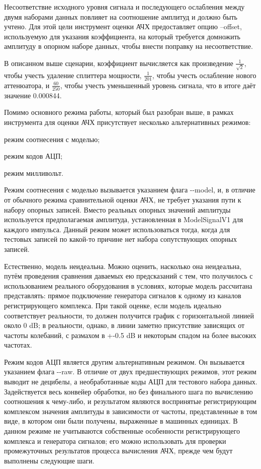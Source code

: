 \documentclass{report}
\begin{document}
Несоответствие исходного уровня сигнала и последующего ослабления между двумя наборами данных повлияет на соотношение амплитуд и должно быть учтено. Для этой цели инструмент оценки АЧХ предоставляет опцию --offset, используемую для указания коэффициента, на который требуется домножить амплитуду в опорном наборе данных, чтобы внести поправку на несоответствие.

В описанном выше сценарии, коэффициент вычисляется как произведение $\frac{1}{\sqrt{2}}$, чтобы учесть удаление сплиттера мощности, $\frac{1}{201}$, чтобы учесть ослабление нового аттенюатора, и $\frac{60}{250}$, чтобы учесть уменьшенный уровень сигнала, что в итоге даёт значение 0.000844.

Помимо основного режима работы, который был разобран выше, в рамках инструмента для оценки АЧХ присутствует несколько альтернативных режимов:

\begin{enummarker}
    \item режим соотнесения с моделью;
    \item режим кодов АЦП;
    \item режим милливольт.
\end{enummarker}

Режим соотнесения с моделью вызывается указанием флага -{}-model, и, в отличие от обычного режима сравнительной оценки АЧХ, не требует указания пути к набору опорных записей. Вместо реальных опорных значений амплитуды используется предполагаемая амплитуда, установленная в ModelSignalV1 для каждого импульса. Данный режим может использоваться тогда, когда для тестовых записей по какой-то причине нет набора сопутствующих опорных записей.

Естественно, модель неидеальна. Можно оценить, насколько она неидеальна, путём проведения сравнения даваемых ею предсказаний с тем, что получилось с использованием реального оборудования в условиях, которые модель рассчитана представлять: прямое подключение генератора сигналов к одному из каналов регистрирующего комплекса. При такой оценке, если модель идеально соответствует реальности, то должен получится график с горизонтальной линией около 0 dB; в реальности, однако, в линии заметно присутствие зависящих от частоты колебаний, с размахом в +-0.5 dB и некоторым спадом на более высоких частотах.

Режим кодов АЦП является другим альтернативным режимом. Он вызывается указанием флага -{}-raw. В отличие от двух предшествующих режимов, этот режим выводит не децибелы, а необработанные коды АЦП для тестового набора данных. Задействуется весь конвейер обработки, но без финального шага по вычислению соотношения к чему-либо, и результатом являются воспринятые регистрирующим комплексом значения амплитуды в зависимости от частоты, представленные в том виде, в котором они были получены, выраженные в машинных единицах. В данном режиме не учитываются собственные особенности регистрирующего комплекса и генератора сигналов; его можно использовать для проверки промежуточных результатов процесса вычисления АЧХ, прежде чем будут выполнены следующие шаги.
\end{document}
